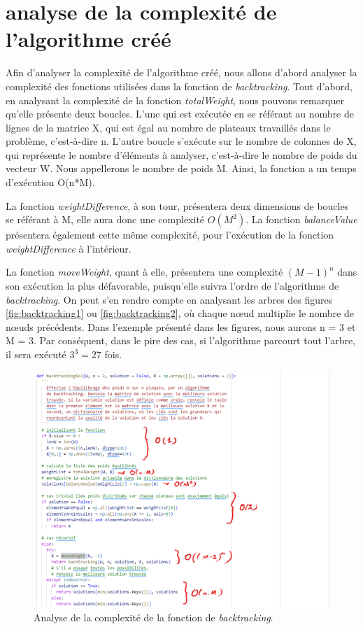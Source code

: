 \documentclass[12pt]{article} %
\begin{document}
\newpage
\section{analyse de la complexité de l'algorithme créé}

Afin d'analyser la complexité de l'algorithme créé, nous allons d'abord analyser la complexité des fonctions utilisées dans la fonction de \textit{backtracking}. Tout d'abord, en analysant la complexité de la fonction \textit{totalWeight}, nous pouvons remarquer qu'elle présente deux boucles. L'une qui est exécutée en se référant au nombre de lignes de la matrice X, qui est égal au nombre de plateaux travaillés dans le problème, c'est-à-dire n. L'autre boucle s'exécute sur le nombre de colonnes de X, qui représente le nombre d'éléments à analyser, c'est-à-dire le nombre de poids du vecteur W. Nous appellerons le nombre de poids M. Ainsi, la fonction a un temps d'exécution O(n*M).

\vfill

La fonction \textit{weightDifference}, à son tour, présentera deux dimensions de boucles se référant à M, elle aura donc une complexité $O(M^2)$. La fonction \textit{balanceValue} présentera également cette même complexité, pour l'exécution de la fonction \textit{weightDifference} à l'intérieur.

\vfill

La fonction \textit{moveWeight}, quant à elle, présentera une complexité $(M-1)^n$ dans son exécution la plus défavorable, puisqu'elle suivra l'ordre de l'algorithme de \textit{backtracking}. On peut s'en rendre compte en analysant les arbres des figures \ref{fig:backtracking1} ou \ref{fig:backtracking2}, où chaque nœud multiplie le nombre de nœuds précédents. Dans l'exemple présenté dans les figures, nous aurons n = 3 et M = 3. Par conséquent, dans le pire des cas, si l'algorithme parcourt tout l'arbre, il sera exécuté $3^3 = 27$ fois.

\vfill

\FloatBarrier
\begin{figure}[!h]
\centering
\includegraphics[width = 0.8\linewidth]{tests/comp.png}
\caption{Analyse de la complexité de la fonction de \textit{backtracking}.}
\label{fig:comp}
\end{figure}
\FloatBarrier
\end{document}
